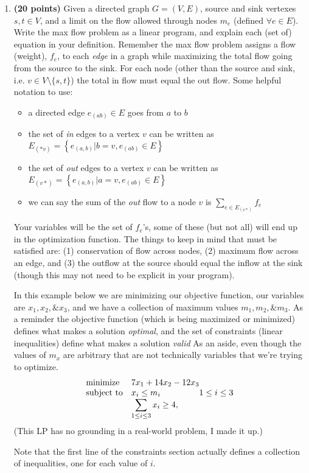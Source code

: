 \documentclass[11pt, oneside]{article}   	%
\begin{document}
\begin{enumerate}
\item \textbf{(20 points)}
Given a directed graph $G = (V,E)$, source and sink vertexes $s,t\in V$, and a limit on the flow allowed through nodes $m_e$ (defined $\forall e\in E$).
Write the max flow problem as a linear program, and explain each (set of) equation in your definition. 
Remember the max flow problem assigns a flow (weight), $f_e$, to each \emph{edge} in a graph
while maximizing the total flow going from the source to the sink. 
For each node (other than the source and sink, i.e. $v\in V\setminus\{s,t\}$) 
the total in flow must equal the out flow. 
Some helpful notation to use:
\begin{itemize}
\item a directed edge $e_{(ab)}\in E$ goes from $a$ to $b$
\item the set of \emph{in} edges to a vertex $v$  can be written as $E_{(*v)} = \left\{e_{(a,b)} | b = v,  e_{(ab)}\in E \right\}$
\item the set of \emph{out} edges to a vertex $v$  can be written as $E_{(v*)} = \left\{e_{(a,b)} | a = v, e_{(ab)}\in E\right\}$ 
\item we can say the sum of the \emph{out} flow to a node $v$ is $\displaystyle\sum_{e \in E_{(v*)}} f_e$
\end{itemize}
Your variables will be the set of $f_e$'s, some of these (but not all) will end up in the optimization function. 
The things to keep in mind that must be satisfied are: 
(1) conservation of flow across nodes, 
(2) maximum flow across an edge, and 
(3) the outflow at the source should equal the inflow at the sink (though this may not need to be explicit in your program). 

\begin{tcolorbox}[colback=blue!5,colframe=blue!75!black,title=Writing down an LP] 
In this example below we are minimizing our objective function, our variables are $x_{1}, x_{2}, \& x_{3}$, and we have a collection of maximum values $m_{1}, m_{2}, \& m_{3}$. 
As a reminder the objective function (which is being maximized or minimized) defines what makes a solution \emph{optimal}, 
and the set of constraints (linear inequalities) define what makes a solution \emph{valid}
As an aside, even though the values of $m_{x}$ are arbitrary that are not technically variables that we're trying to optimize. 
\begin{equation*}
\begin{array}{ll@{}ll}
\text{minimize}  & 7 x_{1} + 14 x_{2} - 12 x_{3} \\
\text{subject to}& x_{i} \leq m_{i}  &1 \le i \le 3\\
			& \displaystyle\sum_{1 \le i \le 3}  x_{i} \geq 4,  &
\end{array}
\end{equation*}
(This LP has no grounding in a real-world problem, I made it up.) 

Note that the first line of the constraints section actually defines a collection of inequalities, one for each value of $i$. 
\end{tcolorbox}

\end{enumerate}
\end{document}
